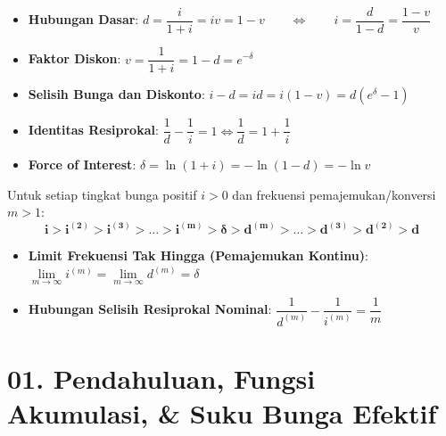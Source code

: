 \documentclass[10pt,a4paper]{article}
\begin{document}
\begin{rumusbox}
\begin{itemize}[leftmargin=1.5em, topsep=1.5pt, itemsep=2pt]
    \item \textbf{Hubungan Dasar}: $d = \dfrac{i}{1+i} = iv = 1 - v \qquad\iff\qquad i = \dfrac{d}{1-d} = \dfrac{1 - v}{v}$
    \item \textbf{Faktor Diskon}: $v = \dfrac{1}{1+i} = 1 - d = e^{-\delta}$
    \item \textbf{Selisih Bunga dan Diskonto}: $i - d = id = i(1-v) = d(e^\delta - 1)$
    \item \textbf{Identitas Resiprokal}: $\dfrac{1}{d} - \dfrac{1}{i} = 1 \iff \dfrac{1}{d} = 1 + \dfrac{1}{i}$
    \item \textbf{Force of Interest}: $\delta = \ln(1+i) = -\ln(1-d) = -\ln v$
\end{itemize}
\end{rumusbox}

\begin{jebakanbox}
Untuk setiap tingkat bunga positif $i > 0$ dan frekuensi pemajemukan/konversi $m > 1$:
\begin{equation*}
    \mathbf{i > i^{(2)} > i^{(3)} > \dots > i^{(m)} > \delta > d^{(m)} > \dots > d^{(3)} > d^{(2)} > d}
\end{equation*}
\begin{itemize}[leftmargin=1.5em, topsep=1pt, itemsep=1.5pt]
    \item \textbf{Limit Frekuensi Tak Hingga (Pemajemukan Kontinu)}: $\lim\limits_{m \to \infty} i^{(m)} = \lim\limits_{m \to \infty} d^{(m)} = \delta$
    \item \textbf{Hubungan Selisih Resiprokal Nominal}: $\dfrac{1}{d^{(m)}} - \dfrac{1}{i^{(m)}} = \dfrac{1}{m}$
\end{itemize}
\end{jebakanbox}

\section*{\large 01. Pendahuluan, Fungsi Akumulasi, \& Suku Bunga Efektif}
\end{document}
